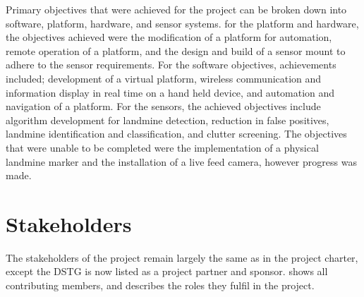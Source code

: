 \documentclass[main.tex]{subfiles}
\begin{document}
Primary objectives that were achieved for the project can be broken down into software, platform, hardware, and sensor systems. for the platform and hardware, the objectives achieved were the modification of a platform for automation, remote operation of a platform, and the design and build of a sensor mount to adhere to the sensor requirements. For the software objectives, achievements included; development of a virtual platform, wireless communication and information display in real time on a hand held device, and automation and navigation of a platform. For the sensors, the achieved objectives include algorithm development for landmine detection, reduction in false positives, landmine identification and classification, and clutter screening. The objectives that were unable to be completed were the implementation of a physical landmine marker and the installation of a live feed camera, however progress was made.

\section{Stakeholders}

The stakeholders of the project remain largely the same as in the project charter, except the DSTG is now listed as a project partner and sponsor.  shows all contributing members, and describes the roles they fulfil in the project.  
\end{document}
